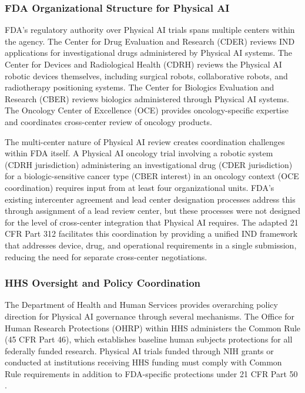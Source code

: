 \subsubsection{FDA Organizational Structure for Physical AI}

FDA's regulatory authority over Physical AI trials spans multiple centers
within the agency. The Center for Drug Evaluation and Research (CDER)
reviews IND applications for investigational drugs administered by Physical
AI systems. The Center for Devices and Radiological Health (CDRH) reviews
the Physical AI robotic devices themselves, including surgical robots,
collaborative robots, and radiotherapy positioning systems. The Center for
Biologics Evaluation and Research (CBER) reviews biologics administered
through Physical AI systems. The Oncology Center of Excellence (OCE)
\cite{fda-oncology-guidance} provides oncology-specific expertise and
coordinates cross-center review of oncology products.

The multi-center nature of Physical AI review creates coordination
challenges within FDA itself. A Physical AI oncology trial involving a
robotic system (CDRH jurisdiction) administering an investigational drug
(CDER jurisdiction) for a biologic-sensitive cancer type (CBER interest) in
an oncology context (OCE coordination) requires input from at least four
organizational units. FDA's existing intercenter agreement and lead center
designation processes address this through assignment of a lead review
center, but these processes were not designed for the level of cross-center
integration that Physical AI requires. The adapted 21 CFR Part 312
\cite{cfr312-adapt} facilitates this coordination by providing a unified
IND framework that addresses device, drug, and operational requirements in a
single submission, reducing the need for separate cross-center negotiations.

\subsubsection{HHS Oversight and Policy Coordination}

The Department of Health and Human Services provides overarching policy
direction for Physical AI governance through several mechanisms. The Office
for Human Research Protections (OHRP) within HHS administers the Common Rule
(45 CFR Part 46), which establishes baseline human subjects protections for
all federally funded research. Physical AI trials funded through NIH grants
or conducted at institutions receiving HHS funding must comply with Common
Rule requirements in addition to FDA-specific protections under 21 CFR Part
50 \cite{cfr-part-50}.

